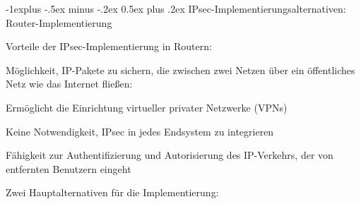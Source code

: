\documentclass[a4paper]{article}
\makeatletter
\renewcommand{\subsection}{\@startsection{subsection}{2}{0mm}%
 {-1explus -.5ex minus -.2ex}%
 {0.5ex plus .2ex}%
 {\normalfont\normalsize\bfseries}}
\makeatother
\begin{document}
\begin{multicols}{3}
      \subsection{IPsec-Implementierungsalternativen: Router-Implementierung}
      \begin{itemize*}
            \item Vorteile der IPsec-Implementierung in Routern:
            \begin{itemize*}
                  \item Möglichkeit, IP-Pakete zu sichern, die zwischen zwei Netzen über ein öffentliches Netz wie das Internet fließen:
                  \begin{itemize*}
                        \item Ermöglicht die Einrichtung virtueller privater Netzwerke (VPNs)
                        \item Keine Notwendigkeit, IPsec in jedes Endsystem zu integrieren
                  \end{itemize*}
                  \item Fähigkeit zur Authentifizierung und Autorisierung des IP-Verkehrs, der von entfernten Benutzern eingeht
            \end{itemize*}
            \item Zwei Hauptalternativen für die Implementierung:
      \end{itemize*}


\end{multicols}
\end{document}
